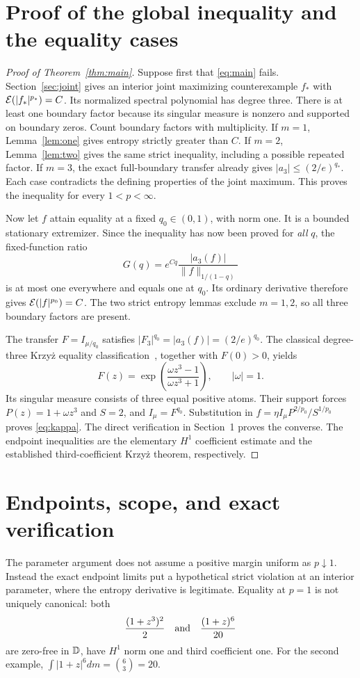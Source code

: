 \section{Proof of the global inequality and the equality cases}
\begin{proof}[Proof of Theorem~\ref{thm:main}]
Suppose first that \eqref{eq:main} fails. Section~\ref{sec:joint} gives an
interior joint maximizing counterexample $f_*$ with
$\mathcal E(|f_*|^{p_*})=C$. Its normalized spectral polynomial has degree three.
There is at least one boundary factor because its singular measure is
nonzero and supported on boundary zeros. Count boundary factors with
multiplicity. If $m=1$, Lemma~\ref{lem:one} gives entropy strictly greater
than $C$. If $m=2$, Lemma~\ref{lem:two} gives the same strict inequality,
including a possible repeated factor. If $m=3$, the exact full-boundary
transfer already gives $|a_3|\le(2/e)^{q_*}$.
Each case contradicts the defining properties of the joint maximum.
This proves the inequality for every $1<p<\infty$.

Now let $f$ attain equality at a fixed $q_0\in(0,1)$, with norm one.
It is a bounded stationary extremizer. Since the inequality has now been
proved for \emph{all} $q$, the fixed-function ratio
\[
 G(q)=e^{Cq}\frac{|a_3(f)|}{\|f\|_{1/(1-q)}}
\]
is at most one everywhere and equals one at $q_0$. Its ordinary derivative
therefore gives $\mathcal E(|f|^{p_0})=C$. The two strict entropy lemmas exclude
$m=1,2$, so all three boundary factors are present.

The transfer $F=I_{\mu/q_0}$ satisfies
$|F_3|^{q_0}=|a_3(f)|=(2/e)^{q_0}$. The classical degree-three Krzy\.{z}
equality classification~\cite{Stupin,HSZ}, together with $F(0)>0$, yields
\[
 F(z)=\exp\left(\frac{\omega z^3-1}{\omega z^3+1}\right),\qquad|\omega|=1.
\]
Its singular measure consists of three equal positive atoms. Their support
forces $P(z)=1+\omega z^3$ and $S=2$, and $I_\mu=F^{q_0}$.
Substitution in $f=\eta I_\mu P^{2/p_0}/S^{1/p_0}$ proves
\eqref{eq:kappa}. The direct verification in Section~1 proves the converse.
The endpoint inequalities are the elementary $H^1$ coefficient estimate
and the established third-coefficient Krzy\.{z} theorem, respectively.
\end{proof}

\section{Endpoints, scope, and exact verification}
The parameter argument does not assume a positive margin uniform as
$p\downarrow1$. Instead the exact endpoint limits put a hypothetical
strict violation at an interior parameter, where the entropy derivative
is legitimate. Equality at $p=1$ is not uniquely canonical: both
\[
 \frac{(1+z^3)^2}{2}\quad\hbox{and}\quad\frac{(1+z)^6}{20}
\]
are zero-free in $\mathbb D$, have $H^1$ norm one and third coefficient one.
For the second example, $\int|1+z|^6dm=\binom63=20$.

